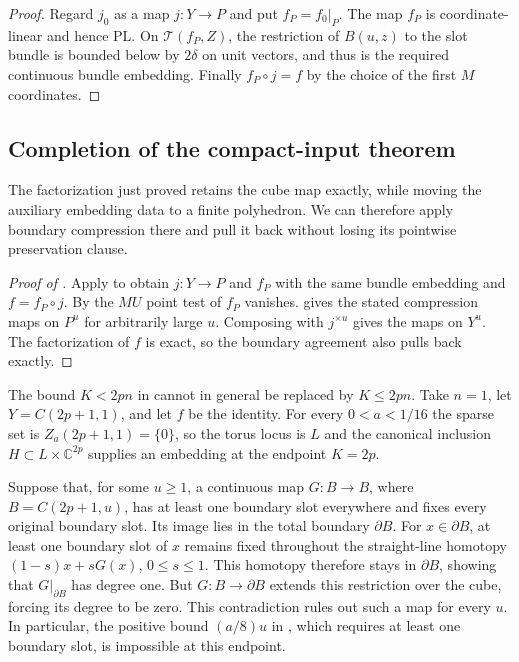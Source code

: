 \begin{proof}
Regard $j_0$ as a map $j:Y\to P$ and put $f_P=f_0|_P$.  The map
$f_P$ is coordinate-linear and hence PL.  On
$\mathcal T(f_P,Z)$, the restriction of $B(u,z)$ to the slot
bundle is bounded below by $2\delta$ on unit vectors, and thus
is the required continuous bundle embedding.  Finally
$f_P\circ j=f$ by the choice of the first $M$ coordinates.
\end{proof}

\subsection{Completion of the compact-input theorem}

The factorization just proved retains the cube map exactly, while
moving the auxiliary embedding data to a finite polyhedron.  We can
therefore apply boundary compression there and pull it back without
losing its pointwise preservation clause.


\begin{proof}[Proof of ]
Apply  to obtain $j:Y\to P$
and $f_P$ with the same bundle embedding and $f=f_P\circ j$.
By  the $MU$ point test of $f_P$ vanishes.
 gives the stated compression maps
on $P^u$ for arbitrarily large $u$.  Composing with $j^{\times u}$
gives the maps on $Y^u$.  The factorization of $f$ is exact, so the
boundary agreement also pulls back exactly.
\end{proof}

\begin{remark}
\label{rem:rank-threshold-sharp}
The bound $K<2pn$ in  cannot in general
be replaced by $K\le2pn$.  Take $n=1$, let $Y=C(2p+1,1)$, and let
$f$ be the identity.  For every $0<a<1/16$ the sparse set is
$Z_a(2p+1,1)=\{0\}$, so the torus locus is $L$ and the canonical
inclusion $H\subset L\times\mathbb C^{2p}$ supplies an embedding
at the endpoint $K=2p$.

Suppose that, for some $u\ge1$, a continuous map
$G:B\to B$, where $B=C(2p+1,u)$, has at least one boundary slot
everywhere and fixes every original boundary slot.  Its image lies
in the total boundary $\partial B$.  For $x\in\partial B$, at least
one boundary slot of $x$ remains fixed throughout the straight-line
homotopy $(1-s)x+sG(x)$, $0\le s\le1$.  This homotopy therefore
stays in $\partial B$, showing that $G|_{\partial B}$ has degree
one.  But $G:B\to\partial B$ extends this restriction over the
cube, forcing its degree to be zero.  This contradiction rules out
such a map for every $u$.  In particular, the positive bound
$(a/8)u$ in , which requires at least
one boundary slot, is impossible at this endpoint.
\end{remark}

